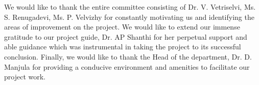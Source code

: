 We would like to thank the entire committee consisting of \newline
Dr. V. Vetriselvi, Ms. S. Renugadevi, Ms. P. Velvizhy for constantly motivating us and identifying the areas of improvement on the project. We would like to extend our immense gratitude to our project guide, Dr. AP Shanthi for her perpetual support and able guidance which was instrumental in taking the project to its successful conclusion. Finally, we would like to thank the Head of the department, Dr. D. Manjula for providing a conducive environment and amenities to facilitate our project work.